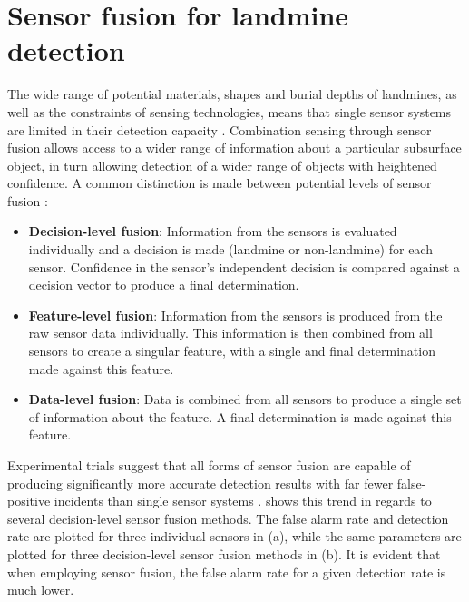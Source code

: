 \documentclass[main.tex]{subfiles}
\begin{document}

\section{Sensor fusion for landmine detection}
The wide range of potential materials, shapes and burial depths of landmines, as well as the constraints of sensing technologies, means that single sensor systems are limited in their detection capacity \parencite{Yarovoy2009}. Combination sensing through sensor fusion allows access to a wider range of information about a particular subsurface object, in turn allowing detection of a wider range of objects with heightened confidence. 
A common distinction is made between potential levels of sensor fusion \parencite{schavemaker2001depth}:
\begin{itemize}
\item \textbf{Decision-level fusion}: Information from the sensors is evaluated individually and a decision is made (landmine or non-landmine) for each sensor. Confidence in the sensor's independent decision is compared against a decision vector to produce a final determination.
\item \textbf{Feature-level fusion}: Information from the sensors is produced from the raw sensor data individually. This information is then combined from all sensors to create a singular feature, with a single and final determination made against this feature. 
\item \textbf{Data-level fusion}: Data is combined from all sensors to produce a single set of information about the feature. A final determination is made against this feature.
\end{itemize}
Experimental trials suggest that all forms of sensor fusion are capable of producing significantly more accurate detection results with far fewer false-positive incidents than single sensor systems \parencite{Yarovoy2009}.  shows this trend in regards to several decision-level sensor fusion methods. The false alarm rate and detection rate are plotted for three individual sensors in  (a), while the same parameters are plotted for three decision-level sensor fusion methods in  (b). It is evident that when employing sensor fusion, the false alarm rate for a given detection rate is much lower.    
\end{document}
